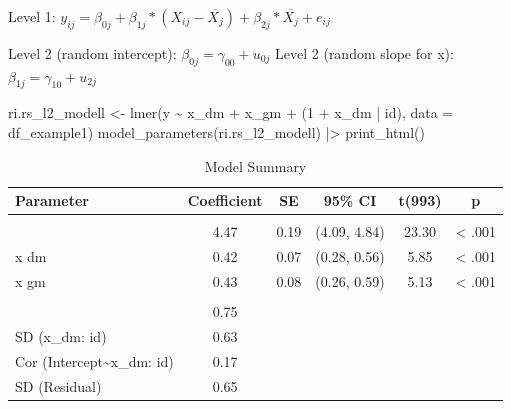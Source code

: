 \documentclass[
  letterpaper,
  DIV=11,
  numbers=noendperiod]{scrreprt}
\newenvironment{Shaded}{\begin{snugshade}}{\end{snugshade}}
\newcommand{\AttributeTok}[1]{\textcolor[rgb]{0.40,0.45,0.13}{#1}}
\newcommand{\DecValTok}[1]{\textcolor[rgb]{0.68,0.00,0.00}{#1}}
\newcommand{\FunctionTok}[1]{\textcolor[rgb]{0.28,0.35,0.67}{#1}}
\newcommand{\NormalTok}[1]{\textcolor[rgb]{0.00,0.23,0.31}{#1}}
\newcommand{\OtherTok}[1]{\textcolor[rgb]{0.00,0.23,0.31}{#1}}
\newcommand{\SpecialCharTok}[1]{\textcolor[rgb]{0.37,0.37,0.37}{#1}}
\begin{document}
Level 1:
\(y_{ij} = \beta_{0j} + \beta_{1j}*(X_{ij}-\overline{X_j}) + \beta_{2j}*\overline{X_j} + e_{ij}\)

Level 2 (random intercept): \(\beta_{0j} = \gamma_{00} + u_{0j}\) Level
2 (random slope for x): \(\beta_{1j} = \gamma_{10} + u_{2j}\)

\begin{Shaded}
\begin{Highlighting}[]
\NormalTok{ri.rs\_l2\_modell }\OtherTok{\textless{}{-}} \FunctionTok{lmer}\NormalTok{(y }\SpecialCharTok{\textasciitilde{}}\NormalTok{ x\_dm }\SpecialCharTok{+}\NormalTok{ x\_gm }\SpecialCharTok{+}\NormalTok{ (}\DecValTok{1} \SpecialCharTok{+}\NormalTok{ x\_dm }\SpecialCharTok{|}\NormalTok{ id), }\AttributeTok{data =}\NormalTok{ df\_example1)}
\FunctionTok{model\_parameters}\NormalTok{(ri.rs\_l2\_modell) }\SpecialCharTok{|\textgreater{}} \FunctionTok{print\_html}\NormalTok{()}
\end{Highlighting}
\end{Shaded}

\begin{table}
\caption*{
{\large Model Summary}
} 
\fontsize{12.0pt}{14.4pt}\selectfont
\begin{tabular*}{\linewidth}{@{\extracolsep{\fill}}lccccc}
\toprule
Parameter & Coefficient & SE & 95\% CI & t(993) & p \\ 
\midrule\addlinespace[2.5pt]
\multicolumn{6}{l}{{\slshape Fixed Effects }} \\[2.5pt] 
\midrule\addlinespace[2.5pt]
{(Intercept)} & 4.47 & 0.19 & (4.09, 4.84) & 23.30 & < .001 \\ 
{x dm} & 0.42 & 0.07 & (0.28, 0.56) & 5.85 & < .001 \\ 
{x gm} & 0.43 & 0.08 & (0.26, 0.59) & 5.13 & < .001 \\ 
\midrule\addlinespace[2.5pt]
\multicolumn{6}{l}{{\slshape Random Effects }} \\[2.5pt] 
\midrule\addlinespace[2.5pt]
{SD (Intercept: id)} & 0.75 &  &  &  &  \\ 
{SD (x\_dm: id)} & 0.63 &  &  &  &  \\ 
{Cor (Intercept\textasciitilde{}x\_dm: id)} & 0.17 &  &  &  &  \\ 
{SD (Residual)} & 0.65 &  &  &  &  \\ 
\bottomrule
\end{tabular*}
\begin{minipage}{\linewidth}
\\
\end{minipage}
\end{table}
\end{document}
